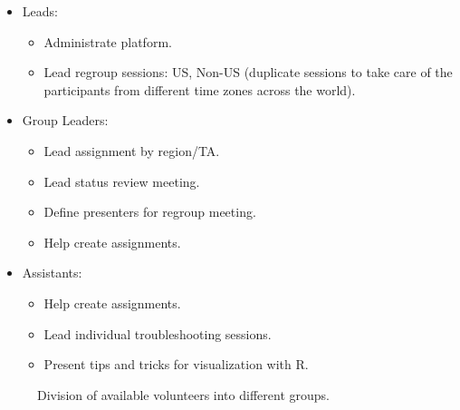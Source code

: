 \begin{itemize}
\tightlist
\item
  Leads:

  \begin{itemize}
  \tightlist
  \item
    Administrate platform.
  \item
    Lead regroup sessions: US, Non-US (duplicate sessions to take care
    of the participants from different time zones across the world).
  \end{itemize}
\item
  Group Leaders:

  \begin{itemize}
  \tightlist
  \item
    Lead assignment by region/TA.
  \item
    Lead status review meeting.
  \item
    Define presenters for regroup meeting.
  \item
    Help create assignments.
  \end{itemize}
\item
  Assistants:

  \begin{itemize}
  \tightlist
  \item
    Help create assignments.
  \item
    Lead individual troubleshooting sessions.
  \item
    Present tips and tricks for visualization with R.
  \end{itemize}
\end{itemize}

\begin{figure}[htbp]
  \centering
  \caption{Division of available volunteers into different groups.}
  \label{figure_vlntrgroups}
\end{figure}

